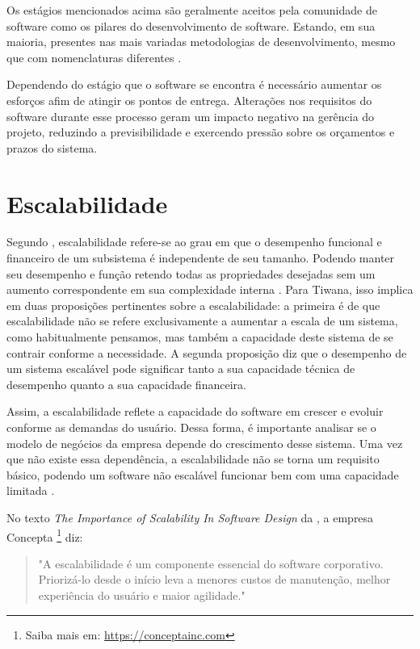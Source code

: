 Os estágios mencionados acima são geralmente aceitos pela comunidade de software
como os pilares do desenvolvimento de software. Estando, em sua maioria, presentes
nas mais variadas metodologias de desenvolvimento, mesmo que com nomenclaturas
diferentes \cite{Despa2014}.

Dependendo do estágio que o software se encontra é
necessário aumentar os esforços afim de atingir os pontos de entrega.
Alterações
nos requisitos do software durante esse processo geram um impacto negativo na
gerência do projeto, reduzindo a previsibilidade e exercendo pressão sobre os
orçamentos e prazos do sistema.

\section{Escalabilidade}

Segundo , escalabilidade refere-se ao grau em que
o desempenho funcional e financeiro de um subsistema é independente de seu tamanho.
Podendo manter seu desempenho e função retendo todas as propriedades desejadas sem
um aumento correspondente em sua complexidade interna
. Para Tiwana, isso implica em duas
proposições pertinentes sobre a escalabilidade: a primeira é de que escalabilidade não
se refere exclusivamente a aumentar a escala de um sistema, como habitualmente
pensamos, mas também a capacidade deste sistema de se contrair conforme a necessidade.
A segunda proposição diz que o desempenho de um sistema escalável pode significar
tanto a sua capacidade técnica de desempenho quanto a sua capacidade financeira.

Assim, a escalabilidade reflete a capacidade do software em crescer e evoluir
conforme as demandas do usuário. Dessa forma, é importante analisar se o
modelo de negócios da empresa depende do crescimento desse sistema. Uma vez que
não existe essa dependência, a escalabilidade não se torna um requisito básico,
podendo um software não escalável funcionar bem com uma capacidade limitada
\cite{ConceptaScalability}.

No texto \textit{The Importance of Scalability In Software Design}
da , a empresa Concepta
\footnote{Saiba mais em: \url{https://conceptainc.com}} diz:

  \begin{quotation}
    "A escalabilidade é um componente essencial do software corporativo. Priorizá-lo
    desde o início leva a menores custos de manutenção, melhor experiência do usuário
    e maior agilidade."
  \end{quotation}

